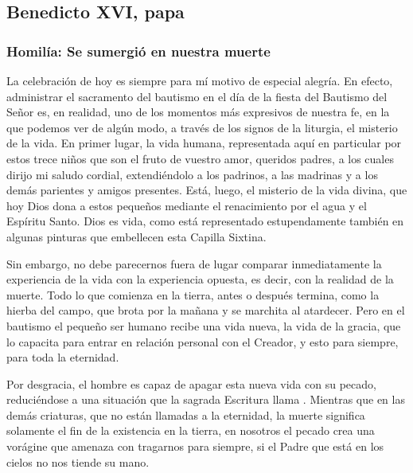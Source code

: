 \newsection


		\subsection{Benedicto XVI, papa}
		
			\subsubsection{Homilía: Se sumergió en nuestra muerte}
			
				
				\begin{body}
					La celebración de hoy es siempre para mí motivo de especial alegría. En efecto, administrar el sacramento del bautismo en el día de la fiesta del Bautismo del Señor es, en realidad, uno de los momentos más expresivos de nuestra fe, en la que podemos ver de algún modo, a través de los signos de la liturgia, el misterio de la vida. En primer lugar, la vida humana, representada aquí en particular por estos trece niños que son el fruto de vuestro amor, queridos padres, a los cuales dirijo mi saludo cordial, extendiéndolo a los padrinos, a las madrinas y a los demás parientes y amigos presentes. Está, luego, el misterio de la vida divina, que hoy Dios dona a estos pequeños mediante el renacimiento por el agua y el Espíritu Santo. Dios es vida, como está representado estupendamente también en algunas pinturas que embellecen esta Capilla Sixtina.
					
					Sin embargo, no debe parecernos fuera de lugar comparar inmediatamente la experiencia de la vida con la experiencia opuesta, es decir, con la realidad de la muerte. Todo lo que comienza en la tierra, antes o después termina, como la hierba del campo, que brota por la mañana y se marchita al atardecer. Pero en el bautismo el pequeño ser humano recibe una vida nueva, la vida de la gracia, que lo capacita para entrar en relación personal con el Creador, y esto para siempre, para toda la eternidad.
					
					Por desgracia, el hombre es capaz de apagar esta nueva vida con su pecado, reduciéndose a una situación que la sagrada Escritura llama . Mientras que en las demás criaturas, que no están llamadas a la eternidad, la muerte significa solamente el fin de la existencia en la tierra, en nosotros el pecado crea una vorágine que amenaza con tragarnos para siempre, si el Padre que está en los cielos no nos tiende su mano.
					

\end{body}

